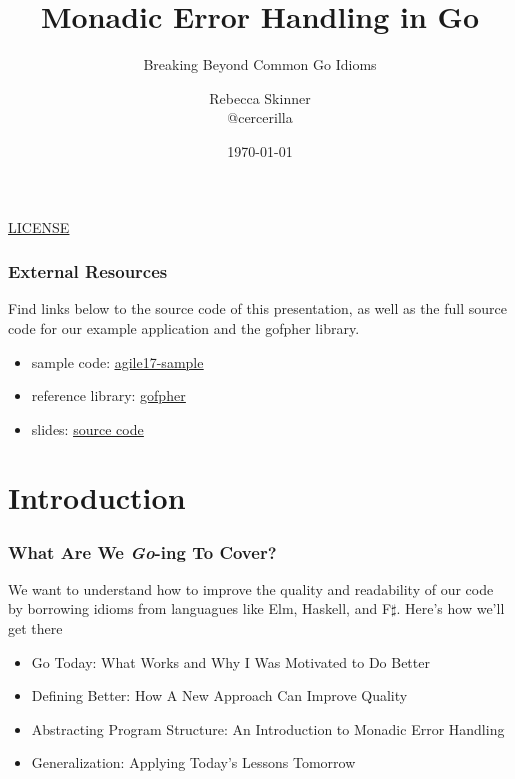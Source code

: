 \documentclass{beamer}
\title{Monadic Error Handling in Go}
\subtitle{Breaking Beyond Common Go Idioms}
\author{Rebecca Skinner\\ \small{@cercerilla}}
\institute{Asteris, LLC}
\date{\today}
\newcommand{\chref}[3] {
  {\color{#1} \href{#2}{\underline{#3}}}
}
\begin{document}
\begin{frame}
  \titlepage{}
  \begin{center}
    \small{\chref{blue}{http://creativecommons.org/licenses/by-sa/4.0/}{LICENSE}}
  \end{center}
\end{frame}

\begin{frame}
  \frametitle{External Resources}
  Find links below to the source code of this presentation, as well as
  the full source code for our example application and the gofpher
  library.
  \\\vfill
  \begin{itemize}
  \item sample code: \chref{blue}{https://github.com/rebeccaskinner/agile17-sample}{agile17-sample}
  \item reference library: \chref{blue}{https://github.com/rebeccaskinner/gofpher}{gofpher}
  \item slides: \chref{blue}{https://github.com/rebeccaskinner/presentations/tree/agile-tech-2017/agile_tech_conference_2017}{source code}
  \end{itemize}
\end{frame}

\section{Introduction}
\begin{frame}
  \frametitle{What Are We \emph{Go}-ing To Cover?}
  We want to understand how to improve the quality and readability of
  our code by borrowing idioms from languagues like Elm, Haskell, and
  F$\sharp$.  Here's how we'll get there
  \\\vfill
  \begin{itemize}
  \item Go Today: What Works and Why I Was Motivated to Do Better
  \item Defining Better: How A New Approach Can Improve Quality
  \item Abstracting Program Structure: An Introduction to Monadic Error Handling
  \item Generalization: Applying Today's Lessons Tomorrow
  \end{itemize}
\end{frame}
\end{document}
